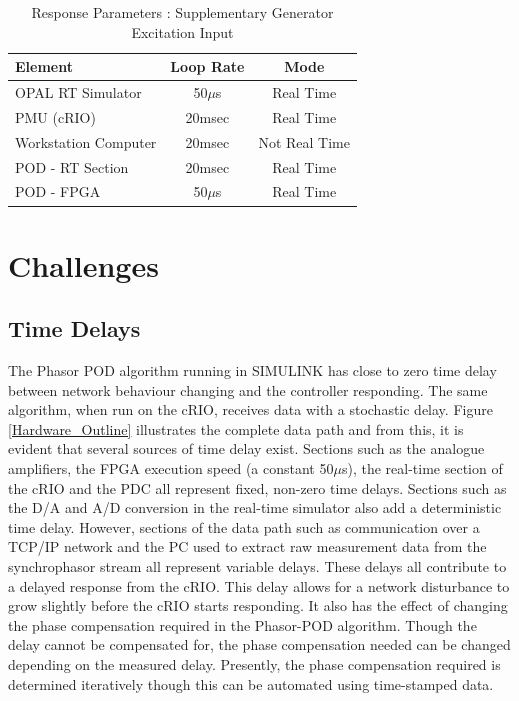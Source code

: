 \documentclass[journal]{IEEEtran}
\begin{document}
\begin{table}[!ht]
\caption{Response Parameters : Supplementary Generator Excitation Input}\label{GENResponseTable}
\begin{center}
\begin{tabular}{|l|c|c|}
\hline \textbf{Element} & \textbf{Loop Rate} & \textbf{Mode} \\
\hline OPAL RT Simulator & 50$\mu$s & Real Time \\ 
\hline PMU (cRIO) & 20msec & Real Time \\ 
\hline Workstation Computer& 20msec & Not Real Time \\ 
\hline POD - RT Section & 20msec & Real Time \\ 
\hline POD - FPGA & 50$\mu$s & Real Time \\ 
\hline 
\end{tabular}
\end{center}
\end{table}  


\section{Challenges}\label{Challenges}

\subsection{Time Delays}

The Phasor POD algorithm running in SIMULINK has close to zero time delay between network behaviour changing and the controller responding. The same algorithm, when run on the cRIO, receives data with a stochastic delay. Figure \ref{Hardware_Outline} illustrates the complete data path and from this, it is evident that several sources of time delay exist. Sections such as the analogue amplifiers, the FPGA execution speed (a constant 50$\mu$s), the real-time section of the cRIO and the PDC all represent fixed, non-zero time delays. Sections such as the D/A and A/D conversion in the real-time simulator also add a deterministic time delay. However, sections of the data path such as communication over a TCP/IP network and the PC used to extract raw measurement data from the synchrophasor stream all represent variable delays. These delays all contribute to a delayed response from the cRIO. This delay allows for a network disturbance to grow slightly before the cRIO starts responding. It also has the effect of changing the phase compensation required in the Phasor-POD algorithm. Though the delay cannot be compensated for, the phase compensation needed can be changed depending on the measured delay. Presently, the phase compensation required is determined iteratively though this can be automated using time-stamped data.\\
\end{document}
